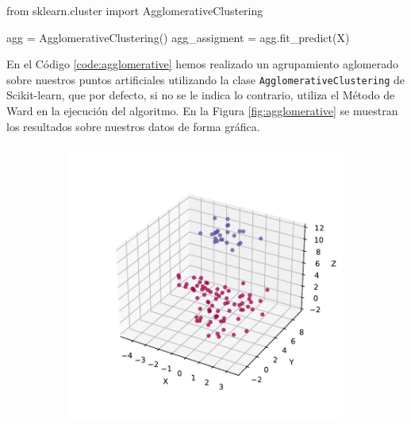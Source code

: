 \begin{mypython}[float={h}, caption={Agrupamiento aglomerativo.}, label={code:agglomerative}]
  from sklearn.cluster import AgglomerativeClustering

  agg = AgglomerativeClustering()
  agg_assigment = agg.fit_predict(X)
\end{mypython}

En el Código \ref{code:agglomerative} hemos realizado un agrupamiento aglomerado sobre nuestros puntos artificiales utilizando la clase \texttt{AgglomerativeClustering} de Scikit-learn, que por defecto, si no se le indica lo contrario, utiliza el Método de Ward en la ejecución del algoritmo. En la Figura \ref{fig:agglomerative} se muestran los resultados sobre nuestros datos de forma gráfica.

\begin{figure}[h]
  \centering
  \begin{subfigure}{0.45\textwidth}
    \centering
    \includegraphics[width=\textwidth]{figures/agglomerative-3d.pdf}
    \caption{}
    \label{fig:agg-3d}
  \end{subfigure}
  \begin{subfigure}{0.45\textwidth}
    \centering

\end{subfigure}
\end{figure}
